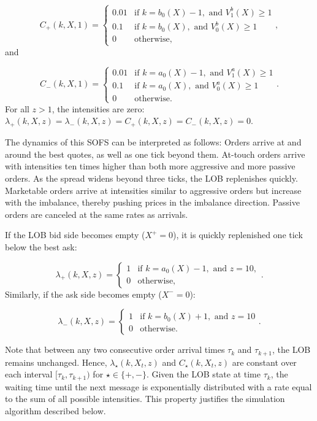 \documentclass[10pt,a4paper,oneside]{article}
\begin{document}
\[
    C_+(k, X, 1) =
    \begin{cases}
        0.01 & \text{if } k = b_0(X) - 1, \text{ and } V^b_1(X) \geq 1 \\
        0.1  & \text{if } k = b_0(X), \text{ and } V^b_0(X) \geq 1     \\
        0    & \text{otherwise,}
    \end{cases},
\]
and

\[
    C_-(k, X, 1) =
    \begin{cases}
        0.01 & \text{if } k = a_0(X) - 1, \text{ and } V^a_1(X) \geq 1 \\
        0.1  & \text{if } k = a_0(X), \text{ and }  V^a_0(X) \geq 1    \\
        0    & \text{otherwise.}
    \end{cases}.
\]
For all $z > 1$, the intensities are zero: $\lambda_+(k, X, z) = \lambda_-(k, X, z) = C_+(k, X, z) = C_-(k, X, z) = 0$.

The dynamics of this SOFS can be interpreted as follows: Orders arrive at and around the best quotes, as well as one tick beyond them. At-touch orders arrive with intensities ten times higher than both more aggressive and more passive orders. As the spread widens beyond three ticks, the LOB replenishes quickly. Marketable orders arrive at intensities similar to aggressive orders but increase with the imbalance, thereby pushing prices in the imbalance direction. Passive orders are canceled at the same rates as arrivals.


If the LOB bid side becomes empty ($X^+ = 0$), it is quickly replenished one tick below the best ask:

\[
    \lambda_+(k, X, z) =
    \begin{cases}
        1 & \text{if } k = a_0(X) - 1, \text{ and } z = 10, \\
        0 & \text{otherwise,}
    \end{cases}.
\]
Similarly, if the ask side becomes empty ($X^- = 0$):

\[
    \lambda_-(k, X, z) =
    \begin{cases}
        1 & \text{if } k = b_0(X) + 1, \text{ and } z = 10 \\
        0 & \text{otherwise.}
    \end{cases}.
\]

Note that between any two consecutive order arrival times $\tau_k$ and $\tau_{k+1}$, the LOB remains unchanged. Hence, $\lambda_{\star}(k, X_t, z)$ and $C_{\star}(k, X_t, z)$ are constant over each interval $[\tau_k, \tau_{k+1})$ for $\star \in \{+, -\}$. Given the LOB state at time $\tau_k$, the waiting time until the next message is exponentially distributed with a rate equal to the sum of all possible intensities. This property justifies the simulation algorithm described below.
\end{document}
